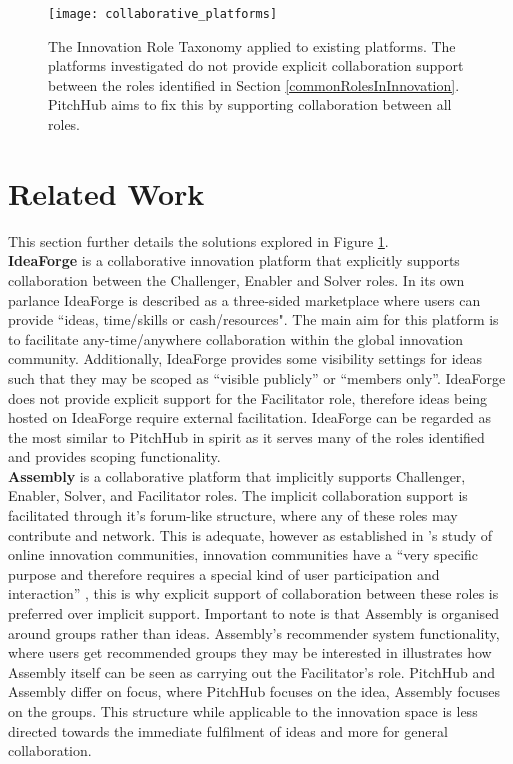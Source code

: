 \begin{figure}[ht]
    \centering
    \texttt{[image: collaborative\_platforms]}
    \caption{The Innovation Role Taxonomy applied to existing platforms. The platforms investigated do not provide explicit collaboration support between the roles identified in Section \ref{commonRolesInInnovation}. PitchHub aims to fix this by supporting collaboration between all roles.}
    \label{fig:collaborative_platforms}
\end{figure}

\section{Related Work}

This section further details the solutions explored in Figure \ref{fig:collaborative_platforms}.
\\
\newline
\textbf{IdeaForge} \cite{ideaForge:online}
is a collaborative innovation platform that explicitly supports collaboration between the Challenger, Enabler and Solver roles. In its own parlance IdeaForge is described as a three-sided marketplace where users can provide ``ideas, time/skills or cash/resources". The main aim for this platform is to facilitate any-time/anywhere collaboration within the global innovation community. Additionally, IdeaForge provides some visibility settings for ideas such that they may be scoped as ``visible publicly'' or ``members only''. IdeaForge does not provide explicit support for the Facilitator role, therefore ideas being hosted on IdeaForge require external facilitation. IdeaForge can be regarded as the most similar to PitchHub in spirit as it serves many of the roles identified and provides scoping functionality.
\\
\newline
\textbf{Assembly} \cite{assembly:online}
is a collaborative platform that implicitly supports Challenger, Enabler, Solver, and Facilitator roles. The implicit collaboration support is facilitated through it's forum-like structure, where any of these roles may contribute and network. This is adequate, however as established in \citeauthor{hautz2010establish}'s study of online innovation communities, innovation communities have a ``very specific purpose and therefore requires a special kind of user participation and interaction'' \cite{hautz2010establish}, this is why explicit support of collaboration between these roles is preferred over implicit support. Important to note is that Assembly is organised around groups rather than ideas. Assembly's recommender system functionality, where users get recommended groups they may be interested in illustrates how Assembly itself can be seen as carrying out the Facilitator's role. PitchHub and Assembly differ on focus, where PitchHub focuses on the idea, Assembly focuses on the groups. This structure while applicable to the innovation space is less directed towards the immediate fulfilment of ideas and more for general collaboration.
